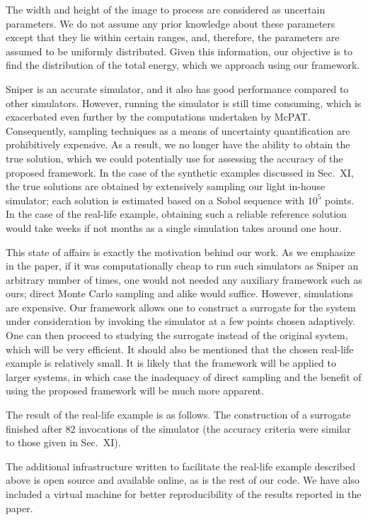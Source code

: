 \begin{authors}
The width and height of the image to process are considered as uncertain
parameters. We do not assume any prior knowledge about these parameters except
that they lie within certain ranges, and, therefore, the parameters are assumed
to be uniformly distributed. Given this information, our objective is to find
the distribution of the total energy, which we approach using our framework.

Sniper is an accurate simulator, and it also has good performance compared to
other simulators. However, running the simulator is still time consuming, which
is exacerbated even further by the computations undertaken by McPAT.
Consequently, sampling techniques as a means of uncertainty quantification are
prohibitively expensive. As a result, we no longer have the ability to obtain
the true solution, which we could potentially use for assessing the accuracy of
the proposed framework. In the case of the synthetic examples discussed in
Sec.~XI, the true solutions are obtained by extensively sampling our light
in-house simulator; each solution is estimated based on a Sobol sequence with
$10^5$ points. In the case of the real-life example, obtaining such a reliable
reference solution would take weeks if not months as a single simulation takes
around one hour.

This state of affairs is exactly the motivation behind our work. As we emphasize
in the paper, if it was computationally cheap to run such simulators as Sniper
an arbitrary number of times, one would not needed any auxiliary framework such
as ours; direct Monte Carlo sampling and alike would suffice. However,
simulations are expensive. Our framework allows one to construct a surrogate for
the system under consideration by invoking the simulator at a few points chosen
adaptively. One can then proceed to studying the surrogate instead of the
original system, which will be very efficient. It should also be mentioned that
the chosen real-life example is relatively small. It is likely that the
framework will be applied to larger systems, in which case the inadequacy of
direct sampling and the benefit of using the proposed framework will be much
more apparent.

The result of the real-life example is as follows. The construction of a
surrogate finished after 82 invocations of the simulator (the accuracy criteria
were similar to those given in Sec.~XI).

The additional infrastructure written to facilitate the real-life example
described above is open source and available online, as is the rest of our code.
We have also included a virtual machine for better reproducibility of the
results reported in the paper.

\begin{actions}
\end{actions}
\end{authors}
